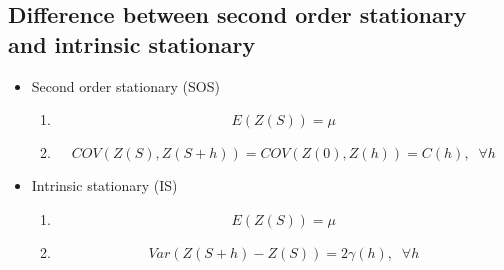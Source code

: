 \documentclass{article}
\begin{document}
\begin{appendices}


\newpage

\section{Difference between second order stationary and intrinsic stationary}\label{sec:SOSIS}

\begin{itemize}
\item Second order stationary (SOS) 
\begin{enumerate}
\item \begin{equation}E(Z(S))=\mu\end{equation}
\item \begin{equation}COV(Z(S),Z(S+h))=COV(Z(0),Z(h))=C(h),\;\;\forall h\end{equation}
\end{enumerate}
\item Intrinsic stationary (IS)
\begin{enumerate}
\item \begin{equation}E(Z(S))=\mu\end{equation}
\item \begin{equation}Var(Z(S+h)-Z(S)) = 2\gamma(h),\;\;\forall h\end{equation}
\end{enumerate}
\end{itemize}


\end{appendices}
\end{document}

